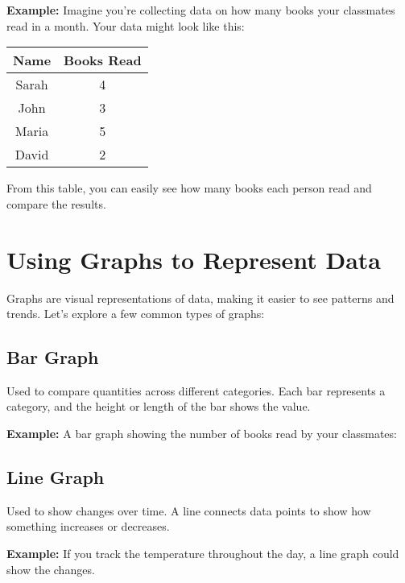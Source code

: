 \textbf{Example:} Imagine you're collecting data on how many books your classmates read in a month. Your data might look like this:

\begin{tabular}{|c|c|}
\hline
Name & Books Read \\
\hline
Sarah & 4 \\
John & 3 \\
Maria & 5 \\
David & 2 \\
\hline
\end{tabular}

From this table, you can easily see how many books each person read and compare the results.

\section{Using Graphs to Represent Data}
Graphs are visual representations of data, making it easier to see patterns and trends. Let’s explore a few common types of graphs:

\subsection{Bar Graph}
Used to compare quantities across different categories. Each bar represents a category, and the height or length of the bar shows the value.

\textbf{Example:} A bar graph showing the number of books read by your classmates:

\subsection{Line Graph}
Used to show changes over time. A line connects data points to show how something increases or decreases.

\textbf{Example:} If you track the temperature throughout the day, a line graph could show the changes.

